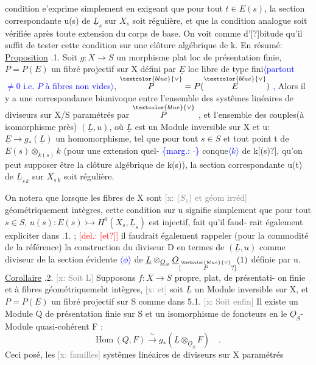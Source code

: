 \documentclass[11pt]{article}
\newcommand{\scanpage}[1]{\par\bigskip\noindent{\small\sffamily[scan #1]}\par}
\newcommand{\mspage}[1]{{\small\sffamily[p.\,#1]}}
\newcommand{\hand}[1]{\textcolor{blue}{#1}}
\let\over\relax
\newcommand{\over}[2]{\textcolor{gray}{#1}\textcolor{blue}{\ensuremath{^{\!\nearrow}}#2}}
\newcommand{\inserted}[2][]{\textcolor{blue}{$\langle$#2$\rangle$}}
\newcommand{\margin}[1]{\textcolor{blue}{\{\textsf{marg.:} #1\}}}
\newcommand{\deleted}[1]{\textcolor{red}{[\textsf{del.:} #1]}}
\newcommand{\xout}[1]{\textcolor{gray}{[\textsf{x:} #1]}}
\newcommand{\uline}[1]{\underline{#1}}
\newcommand{\unsure}[1]{[#1?]}
\begin{document}
\mspage{123}

\clearpage
\scanpage{25/124}
\mspage{27}

condition e'exprime simplement en exigeant que pour tout $t\in E(s)$,
la section correspondante u(s) de $\underline{L}_s$ sur $X_s$ soit régulière, et que la
condition analogue soit vérifiée après toute extension du corps de base.
On voit comme d'\unsure{\over{ha}{h}}bitude qu'il suffit de tester cette condition sur une
clôture algébrique de k. En résumé:
\uline{Proposition} \over{5}{4}.1. Soit $g:X\to S$ un morphisme plat loc de présentation
finie, $P=P(E)$ un fibré projectif sur X défini par $\underline{E}$ loc libre de type
fini\inserted{partout $\neq 0$ i.e. $P$ à fibres non vides}, $\overset{\hand{\vee}}{P} = P(\overset{\hand{\vee}}{E})$ \hand{,} Alors il y a une correspondance biunivoque entre
l'ensemble des systêmes linéaires de diviseurs sur X/S paramétrés par $\overset{\hand{\vee}}{P}$ ,
et l'ensemble des couples(à isomorphisme près) $(\underline{L},u)$, où $\underline{L}$ est un
Module inversible sur X et u: $\underline{E}\to g_*(\underline{L})$ un homomorphisme, tel que
pour tout $s\in S$ et tout point t de $E(s)\otimes_{k(s)}k$ (pour une extension quel-%
\margin{$\cdot$} conque\inserted{$k$} de k\unsure{(s)}, qu'on peut supposer être la clôture algébrique de k(s)),
la section correspondante u(t) de $\underline{L}_{s\,k}$ sur $X_{s\,k}$ soit régulière.

On notera que lorsque les fibres de X sont \xout{($S_1$) et géom irréd}
géométriquement intègres, cette condition sur u signifie simplement que
pour tout $s\in S$, $u(s): E(s)\rightarrowtail H^{0}(X_s,\underline{L}_s)$ est injectif, fait qu'il faud-%
rait également expliciter dans \over{5}{4}.1. ; \deleted{\unsure{et}} il faudrait également rappeler
(pour la commodité de la référence) la construction du diviseur D en
termes de $(\underline{L},u)$ comme diviseur de la section évidente \inserted{$\phi$} de $\underline{L}\otimes_{\underline{O}_S}\underline{O}_{\unsure{\overset{\hand{\vee}}{P}}}(1)$
définie par u.
\uline{Corollaire} \over{5}{4}.2. \xout{Soit L} Supposons $f: X\longrightarrow S$ propre, plat, de présentati-%
on finie et à fibres géométriquemeht intègres, \xout{et} soit $\underline{L}$ un Module
inversible sur X, et $P=P(\underline{E})$ un fibré projectif sur S comme dans 5.1.
\xout{Soit enfin} Il existe un Module Q de présentation finie sur S et un
isomorphisme de foncteurs en le $\underline{O}_S$-Module quasi-cohérent F :
\[ \mathrm{Hom}\,(Q,F) \xrightarrow{\ \sim\ } g_*(\underline{L}\otimes_{\underline{O}_S}F) \quad . \]
Ceci posé, les \xout{familles} systêmes linéaires de diviseurs sur X paramétrés
\end{document}
